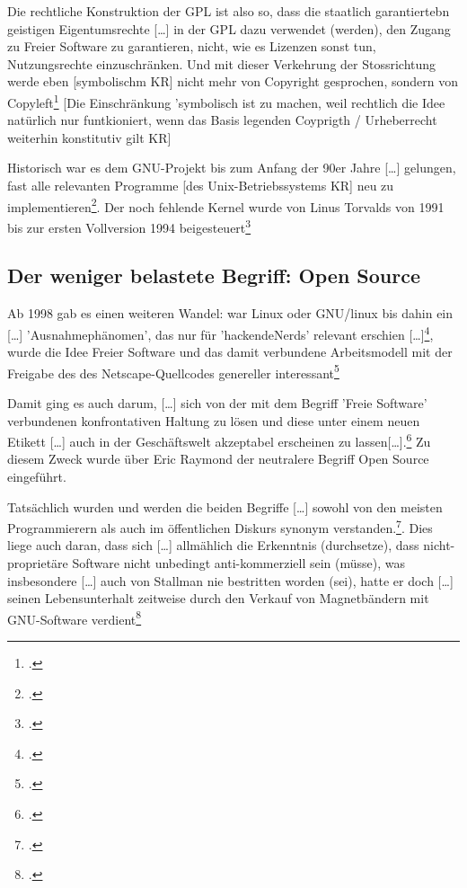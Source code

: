 \documentclass[DIV=calc,BCOR=5mm,11pt,headings=small,oneside,abstract=true, toc=bib]{scrartcl}
\begin{document}
Die rechtliche Konstruktion der GPL ist also so, dass \glqq{}die
staatlich garantiertebn geistigen Eigentumsrechte [\ldots] in der GPL
dazu verwendet (werden), den Zugang zu Freier Software zu garantieren\grqq{},
nicht, wie es Lizenzen sonst tun, Nutzungsrechte einzuschränken. Und mit dieser
Verkehrung der Stossrichtung werde eben [symbolischm KR] nicht mehr von
Copyright gesprochen, sondern von
\glqq{}Copyleft\grqq{}\footcite[vgl.][110]{Eckl2004a} [Die Einschränkung
'symbolisch ist zu machen, weil rechtlich die Idee natürlich nur funtkioniert,
wenn das Basis legenden Coyprigth / Urheberrecht weiterhin konstitutiv gilt KR]

Historisch war es dem GNU-Projekt bis zum \glqq{}Anfang der 90er Jahre
[\ldots] gelungen, fast alle relevanten Programme [des
Unix-Betriebssystems KR] neu zu
implementieren\grqq{}\footcite[vgl.][111]{Eckl2004a}. Der noch fehlende Kernel
wurde von Linus Torvalds von 1991 bis zur \glqq{}ersten Vollversion\grqq{} 1994
beigesteuert\footcite[vgl.][112]{Eckl2004a}

\subsection{Der weniger belastete Begriff: Open Source}

Ab 1998 gab es einen weiteren Wandel: war Linux oder GNU/linux bis dahin ein
\glqq{}[\ldots] 'Ausnahmephänomen', das nur für 'hackendeNerds' relevant
erschien [\ldots]\grqq{}\footcite[vgl.][113]{Eckl2004a}, wurde die Idee Freier
Software und das damit verbundene Arbeitsmodell mit der Freigabe des des
\glqq{}Netscape-Quellcodes\grqq{} genereller
interessant\footcite[vgl.][113]{Eckl2004a}

Damit ging es auch darum, \glqq{}[\ldots] sich von der mit dem Begriff
'Freie Software' verbundenen konfrontativen Haltung zu lösen\grqq{} und diese
unter einem neuen Etikett \glqq{}[\ldots] auch in der Geschäftswelt
akzeptabel erscheinen zu lassen[\ldots]\grqq{}.\footcite[vgl.][114]{Eckl2004a}
Zu diesem Zweck wurde über Eric Raymond der neutralere Begriff
\glqq{}Open Source\grqq{} eingeführt.

Tatsächlich wurden und werden die beiden Begriffe \glqq{}[\ldots] sowohl von den
meisten Programmierern als auch im öffentlichen Diskurs synonym
verstanden\grqq{}.\footcite[vgl.][115]{Eckl2004a}. Dies liege auch daran, dass
sich \glqq{}[\ldots] allmählich die Erkenntnis (durchsetze), dass
nicht-proprietäre Software nicht unbedingt anti-kommerziell sein (müsse)\grqq{},
was insbesondere \glqq{}[\ldots] auch von Stallman nie bestritten worden
(sei)\grqq{}, hatte er doch \glqq{}[\ldots] seinen Lebensunterhalt zeitweise
durch den Verkauf von Magnetbändern mit GNU-Software
verdient\grqq{}\footcite[vgl.][116]{Eckl2004a}
\small

\end{document}
